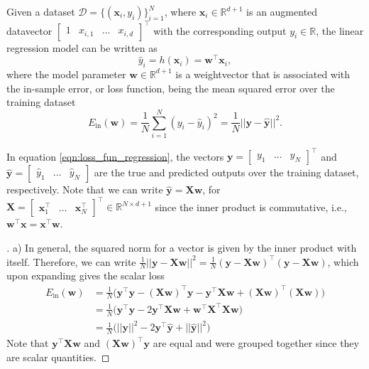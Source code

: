 \documentclass{article}
\newcommand{\R}{\mathbb{R}}
\newcommand{\mat}[1]{\begin{bmatrix}#1\end{bmatrix}}
\renewcommand{\vec}[1]{\mathbf{#1}}
\begin{document}
    Given a dataset $\mathcal{D} = \{(\vec{x}_i, y_i)\}_{i=1}^N$, where 
    $\vec{x}_i\in\R^{d+1}$ is an augmented datavector 
    $\mat{1 & x_{i,1} & \ldots & x_{i, d}}^\top$ with the corresponding 
    output $y_i \in \R$, the linear regression model can be written as
    \begin{equation}
       \hat{y}_i = h(\vec{x}_i) = \vec{w}^\top\vec{x}_i,
    \end{equation}
    where the model parameter $\vec{w} \in \R^{d+1}$ is a weightvector that
    is associated with the in-sample error, or loss function, being the 
    mean squared error over the training dataset
    \begin{equation}
        \label{eqn:loss_fun_regression}
        E_{\text{in}}(\vec{w}) = \frac{1}{N}\sum_{i=1}^N (y_i - \hat{y}_i)^2 
        = \frac{1}{N}||\vec{y}-\hat{\vec{y}}||^2.
    \end{equation}

    In equation \eqref{eqn:loss_fun_regression}, the vectors $\vec{y} = 
    \mat{y_1 & \ldots & y_N}^\top$ and $\hat{\vec{y}} = \mat{\hat{y}_1 & 
    \ldots & \hat{y}_N}$ are the true and predicted outputs over the training 
    dataset, respectively. Note that we can write $\hat{\vec{y}} = \vec{X}
    \vec{w}$, for $\vec{X}=\mat{\vec{x}_1^\top & \ldots & \vec{x}_N^
    \top} ^\top \in \R^{N \times d+1}$ since the inner product is 
    commutative, i.e., $\vec{w}^\top \vec{x} = \vec{x}^\top \vec{w}$.

    \begin{proof}[\unskip\nopunct]
        a) In general, the squared norm for a vector is given by the inner 
        product with itself. Therefore, we can write
        $\frac{1}{N}||\vec{y}-\vec{X}\vec{w}||^2 = \frac{1}{N}(\vec{y}-\vec{X}
        \vec{w})^\top(\vec{y} - \vec{X}\vec{w})$, which upon expanding 
        gives the scalar loss 
        \begin{align}
            E_{\text{in}}(\vec{w}) &= 
            \frac{1}{N}\Big(\vec{y}^\top\vec{y}-(\vec{X}
            \vec{w})^\top\vec{y} - \vec{y}^\top \vec{X}\vec{w}
            + (\vec{X}\vec{w})^\top (\vec{X}\vec{w}) \Big) \nonumber\\
            &= \frac{1}{N}\big(\vec{y}^\top\vec{y} - 2\vec{y}^\top 
            \vec{X}\vec{w} + \vec{w}^\top \vec{X}^\top
            \vec{X}\vec{w}\big) \label{eqn:loss_fun_regression_vector}\\
            &= \frac{1}{N}\big(||\vec{y}||^2-2\vec{y}^\top\hat{\vec{y}} 
            + ||\hat{\vec{y}}||^2\big) \nonumber
        \end{align}
        Note that $\vec{y}^\top\vec{X}\vec{w}$ and $(\vec{X}\vec{w})
        ^\top\vec{y}$ are equal and were grouped together since 
        they are scalar quantities.
    \end{proof}
\end{document}
